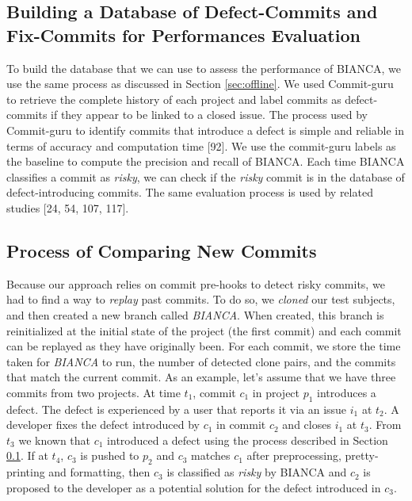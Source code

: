 \documentclass[12pt]{report}
\begin{document}


\subsection{Building a Database of Defect-Commits and Fix-Commits for
Performances Evaluation}\label{sub:golden}

To build the database that we can use to assess the performance of
BIANCA, we use the same process as discussed in Section
\ref{sec:offline}. We used Commit-guru to retrieve the complete history
of each project and label commits as defect-commits if they appear to be
linked to a closed issue. The process used by Commit-guru to identify
commits that introduce a defect is simple and reliable in terms of
accuracy and computation time {[}92{]}. We use the commit-guru labels as
the baseline to compute the precision and recall of BIANCA. Each time
BIANCA classifies a commit as \emph{risky}, we can check if the
\emph{risky} commit is in the database of defect-introducing commits.
The same evaluation process is used by related studies {[}24, 54, 107,
117{]}.

\subsection{Process of Comparing New Commits}\label{sec:newcommits}

Because our approach relies on commit pre-hooks to detect risky commits,
we had to find a way to \emph{replay} past commits. To do so, we
\emph{cloned} our test subjects, and then created a new branch called
\emph{BIANCA}. When created, this branch is reinitialized at the initial
state of the project (the first commit) and each commit can be replayed
as they have originally been. For each commit, we store the time taken
for \emph{BIANCA} to run, the number of detected clone pairs, and the
commits that match the current commit. As an example, let's assume that
we have three commits from two projects. At time \(t_1\), commit \(c_1\)
in project \(p_1\) introduces a defect. The defect is experienced by a
user that reports it via an issue \(i_1\) at \(t_2\). A developer fixes
the defect introduced by \(c_1\) in commit \(c_2\) and closes \(i_1\) at
\(t_3\). From \(t_3\) we known that \(c_1\) introduced a defect using
the process described in Section \ref{sub:golden}. If at \(t_4\),
\(c_3\) is pushed to \(p_2\) and \(c_3\) matches \(c_1\) after
preprocessing, pretty-printing and formatting, then \(c_3\) is
classified as \emph{risky} by BIANCA and \(c_2\) is proposed to the
developer as a potential solution for the defect introduced in \(c_3\).
\end{document}
